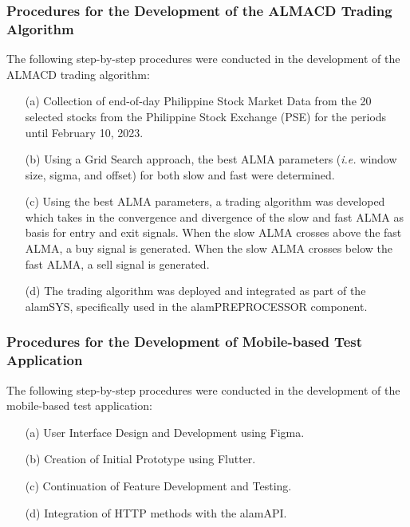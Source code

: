 \subsubsection{Procedures for the Development of the ALMACD Trading Algorithm}
\label{subsubsec:proc_almacd}
The following step-by-step procedures were conducted in the development
of the ALMACD trading algorithm:
\begin{itemize}
    \item[(a)] Collection of end-of-day Philippine Stock Market Data from the
    20 selected stocks from the Philippine Stock Exchange (PSE) for the periods
    until February 10, 2023.
    \item[(b)] Using a Grid Search approach, the best ALMA parameters 
    (\textit{i.e.} window size, sigma, and offset) for both slow and fast were
    determined.
    \item[(c)] Using the best ALMA parameters, a trading algorithm was developed
    which takes in the convergence and divergence of the slow and fast ALMA as basis
    for entry and exit signals. When the slow ALMA crosses above the fast ALMA, a
    buy signal is generated. When the slow ALMA crosses below the fast ALMA, a sell
    signal is generated.
    \item[(d)] The trading algorithm was deployed and integrated as part of the
    alamSYS, specifically used in the alamPREPROCESSOR component.
\end{itemize}

\subsubsection{Procedures for the Development of Mobile-based Test Application}
\label{subsubsec:proc_mobdev}
The following step-by-step procedures were conducted in the development
of the mobile-based test application:
\begin{itemize}
    \item[(a)] User Interface Design and Development using Figma.
    \item[(b)] Creation of Initial Prototype using Flutter.
    \item[(c)] Continuation of Feature Development and Testing.
    \item[(d)] Integration of HTTP methods with the alamAPI.
\end{itemize}

